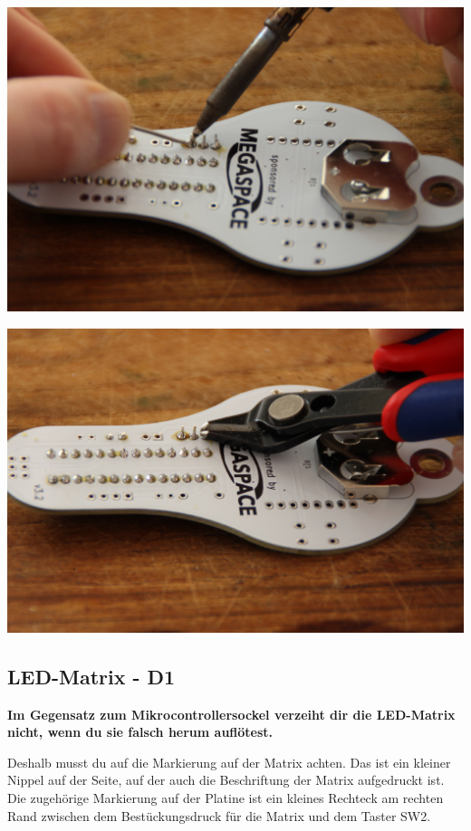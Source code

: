 \documentclass{article}
\begin{document}
\begin{minipage}[b]{0.5\textwidth}
	\includegraphics[width=\textwidth]{Bilder2023/IMG_8372.JPG}
\end{minipage}
\begin{minipage}[b]{0.5\textwidth}
	\includegraphics[width=\textwidth]{Bilder2023/IMG_8373.JPG}
\end{minipage}

\subsection{LED-Matrix - D1}

\textbf{Im Gegensatz zum Mikrocontrollersockel verzeiht dir die LED-Matrix nicht, wenn du sie falsch herum auflötest.} 

Deshalb musst du auf die Markierung auf der Matrix achten. Das ist ein kleiner Nippel auf der Seite, auf der auch die Beschriftung der Matrix aufgedruckt ist. Die zugehörige Markierung auf der Platine ist ein kleines Rechteck am rechten Rand zwischen dem Bestückungsdruck für die Matrix und dem Taster SW2.
\end{document}
